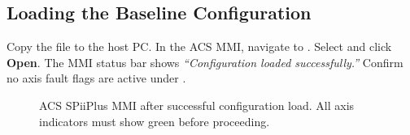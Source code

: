 \subsection{Loading the Baseline Configuration}
\label{sec:setup:config}

\begin{steplist}
  \step Copy the file  to the
        host PC.
  \step In the ACS MMI, navigate to .
  \step Select  and click
        \textbf{Open}.
  \step The MMI status bar shows \textit{``Configuration loaded
        successfully.''} Confirm no axis fault flags are active under
        .
\end{steplist}


\begin{figure}[H]
  \centering
  \caption{ACS SPiiPlus MMI after successful configuration load.
           All axis indicators must show green before proceeding.}
  \label{fig:mmi-status}
\end{figure}
